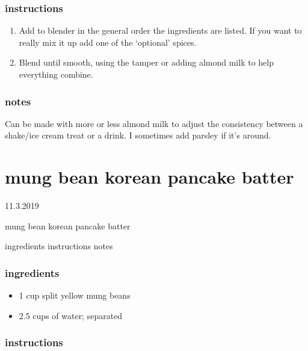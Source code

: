 \documentclass[]{book}
\providecommand{\tightlist}{%
  \setlength{\itemsep}{0pt}\setlength{\parskip}{0pt}}
\begin{document}
\hypertarget{instructions-7}{%
\subsection{instructions}\label{instructions-7}}

\begin{enumerate}
\def\labelenumi{\arabic{enumi}.}
\tightlist
\item
  Add to blender in the general order the ingredients are listed. If you want to really mix it up add one of the `optional' spices.
\item
  Blend until smooth, using the tamper or adding almond milk to help everything combine.
\end{enumerate}

\hypertarget{notes-7}{%
\subsection{notes}\label{notes-7}}

Can be made with more or less almond milk to adjust the consistency between a shake/ice cream treat or a drink. I
sometimes add parsley if it's around.

\hypertarget{mung-bean-korean-pancake-batter}{%
\chapter{mung bean korean pancake batter}\label{mung-bean-korean-pancake-batter}}

11.3.2019

mung bean korean pancake batter

ingredients \textbar{}
instructions \textbar{}
notes

\hypertarget{ingredients-8}{%
\subsection{ingredients}\label{ingredients-8}}

\begin{itemize}
\tightlist
\item
  1 cup split yellow mung beans
\item
  2.5 cups of water; separated
\end{itemize}

\hypertarget{instructions-8}{%
\subsection{instructions}\label{instructions-8}}
\end{document}
